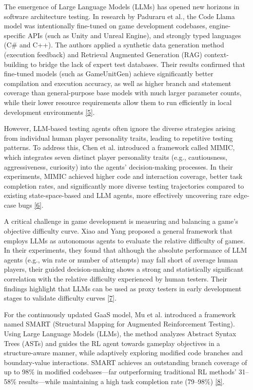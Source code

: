 \documentclass[12pt]{article}
\begin{document}
The emergence of Large Language Models (LLMs) has opened new horizons in software architecture testing. In research by Paduraru et al., the Code Llama model was intentionally fine-tuned on game development codebases, engine-specific APIs (such as Unity and Unreal Engine), and strongly typed languages (C\# and C++). The authors applied a synthetic data generation method (execution feedback) and Retrieval Augmented Generation (RAG) context-building to bridge the lack of expert test databases. Their results confirmed that fine-tuned models (such as GameUnitGen) achieve significantly better compilation and execution accuracy, as well as higher branch and statement coverage than general-purpose base models with much larger parameter counts, while their lower resource requirements allow them to run efficiently in local development environments \hyperref[ref-5]{[5]}.

However, LLM-based testing agents often ignore the diverse strategies arising from individual human player personality traits, leading to repetitive testing patterns. To address this, Chen et al. introduced a framework called MIMIC, which integrates seven distinct player personality traits (e.g., cautiousness, aggressiveness, curiosity) into the agents' decision-making processes. In their experiments, MIMIC achieved higher code and interaction coverage, better task completion rates, and significantly more diverse testing trajectories compared to existing state-space-based and LLM agents, more effectively uncovering rare edge-case bugs \hyperref[ref-6]{[6]}.

A critical challenge in game development is measuring and balancing a game's objective difficulty curve. Xiao and Yang proposed a general framework that employs LLMs as autonomous agents to evaluate the relative difficulty of games. In their experiments, they found that although the absolute performance of LLM agents (e.g., win rate or number of attempts) may fall short of average human players, their guided decision-making shows a strong and statistically significant correlation with the relative difficulty experienced by human testers. Their findings highlight that LLMs can be used as proxy testers in early development stages to validate difficulty curves \hyperref[ref-7]{[7]}.

For the continuously updated GaaS model, Mu et al. introduced a framework named SMART (Structural Mapping for Augmented Reinforcement Testing). Using Large Language Models (LLMs), the method analyzes Abstract Syntax Trees (ASTs) and guides the RL agent towards gameplay objectives in a structure-aware manner, while adaptively exploring modified code branches and boundary-value interactions. SMART achieves an outstanding branch coverage of up to 98\% in modified codebases---far outperforming traditional RL methods' 31--58\% results---while maintaining a high task completion rate (79--98\%) \hyperref[ref-8]{[8]}.
\end{document}
